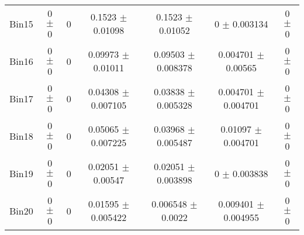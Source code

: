 \begin{tabular}{@{\extracolsep{4pt}}lcccccc@{}}
     Bin15 & 0 $\pm$ 0 & 0 & 0.1523 $\pm$ 0.01098 & 0.1523 $\pm$ 0.01052 & 0 $\pm$ 0.003134 & 0 $\pm$ 0 \\ 
     Bin16 & 0 $\pm$ 0 & 0 & 0.09973 $\pm$ 0.01011 & 0.09503 $\pm$ 0.008378 & 0.004701 $\pm$ 0.00565 & 0 $\pm$ 0 \\ 
     Bin17 & 0 $\pm$ 0 & 0 & 0.04308 $\pm$ 0.007105 & 0.03838 $\pm$ 0.005328 & 0.004701 $\pm$ 0.004701 & 0 $\pm$ 0 \\ 
     Bin18 & 0 $\pm$ 0 & 0 & 0.05065 $\pm$ 0.007225 & 0.03968 $\pm$ 0.005487 & 0.01097 $\pm$ 0.004701 & 0 $\pm$ 0 \\ 
     Bin19 & 0 $\pm$ 0 & 0 & 0.02051 $\pm$ 0.00547 & 0.02051 $\pm$ 0.003898 & 0 $\pm$ 0.003838 & 0 $\pm$ 0 \\ 
     Bin20 & 0 $\pm$ 0 & 0 & 0.01595 $\pm$ 0.005422 & 0.006548 $\pm$ 0.0022 & 0.009401 $\pm$ 0.004955 & 0 $\pm$ 0 \\ 
\hline\hline
  \end{tabular}
